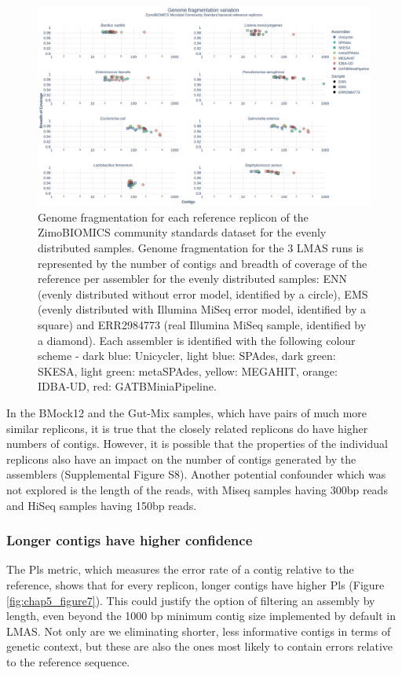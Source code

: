 \begin{figure}[h!]
\centering
\includegraphics[width=\textwidth]{figures/chapter 5/Figure 6.pdf}
\caption{Genome fragmentation for each reference replicon of the ZimoBIOMICS community standards dataset for the evenly distributed samples. Genome fragmentation for the 3 LMAS runs is represented by the number of contigs and breadth of coverage of the reference per assembler for the evenly distributed samples: ENN (evenly distributed without error model, identified by a circle), EMS (evenly distributed with Illumina MiSeq error model, identified by a square) and ERR2984773 (real Illumina MiSeq sample, identified by a diamond). Each assembler is identified with the following colour scheme - dark blue: Unicycler, light blue: SPAdes, dark green: SKESA, light green: metaSPAdes, yellow: MEGAHIT, orange: IDBA-UD, red: GATBMiniaPipeline.}
\label{fig:chap5_figure6}
\end{figure}

In the BMock12 and the Gut-Mix samples, which have pairs of much more similar replicons, it is true that the closely related replicons do have higher numbers of contigs. However, it is possible that the properties of the individual replicons also have an impact on the number of contigs generated by the assemblers (Supplemental Figure S8). Another potential confounder which was not explored is the length of the reads, with Miseq samples having 300bp reads and HiSeq samples having 150bp reads.

\subsubsection{Longer contigs have higher confidence}

The \ac{Pls} metric, which measures the error rate of a contig relative to the reference, shows that for every replicon, longer contigs have higher \ac{Pls} (Figure \ref{fig:chap5_figure7}). This could justify the option of filtering an assembly by length, even beyond the 1000 \ac{bp} minimum contig size implemented by default in LMAS. Not only are we eliminating shorter, less informative contigs in terms of genetic context, but these are also the ones most likely to contain errors relative to the reference sequence. 

